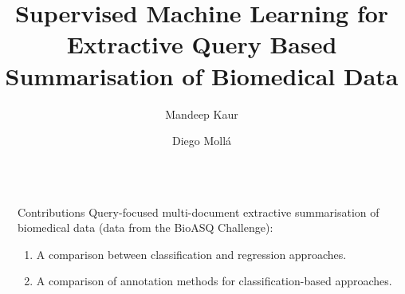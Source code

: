 \documentclass[final]{beamer}
\title{Supervised Machine Learning for Extractive Query Based Summarisation of Biomedical Data} %
\author{Mandeep Kaur \and Diego Moll\'a} %
\institute{Macquarie University} %
\newlength{\sepwid}
\newlength{\twocolwid}
\begin{document}

\setlength{\belowcaptionskip}{2ex} %
\setlength\belowdisplayshortskip{2ex} %

\begin{frame}[t] %

\begin{columns}[t] %

\begin{column}{\sepwid}\end{column} %

\begin{column}{\twocolwid} %


\begin{alertblock}{Contributions}
\Large Query-focused multi-document extractive summarisation of biomedical data (data from the BioASQ Challenge):
\begin{enumerate}
\item A comparison between classification and regression approaches.
\item A comparison of annotation methods for classification-based approaches.
\end{enumerate}

\end{alertblock}




\end{column}
\end{columns}
\end{frame}
\end{document}
